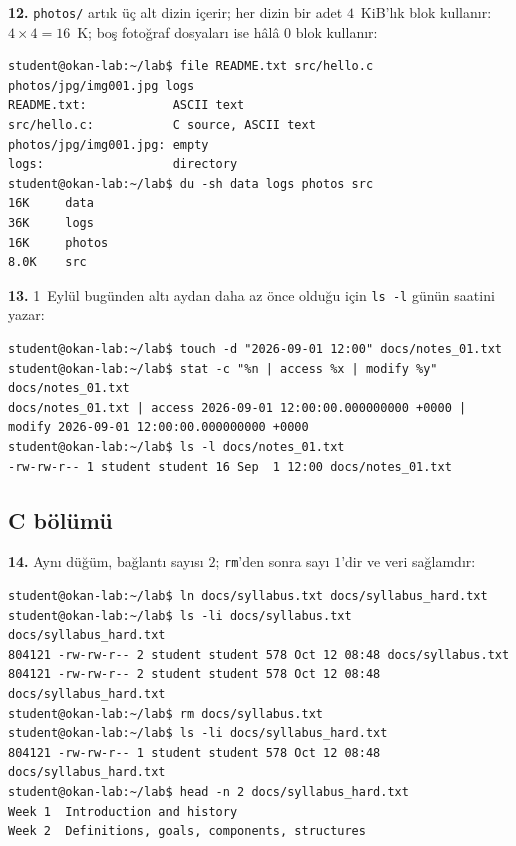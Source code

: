 \documentclass[11pt,a4paper]{article}
\newcommand{\cmd}[1]{\texttt{#1}}
\begin{document}
\textbf{12.} \texttt{photos/} artık üç alt dizin içerir; her dizin bir adet $4$~KiB'lık blok kullanır: $4 \times 4 = 16$~K; boş fotoğraf dosyaları ise hâlâ $0$ blok kullanır:
\begin{lstlisting}[style=term,basicstyle=\ttfamily\scriptsize\color{light}]
student@okan-lab:~/lab$ file README.txt src/hello.c photos/jpg/img001.jpg logs
README.txt:            ASCII text
src/hello.c:           C source, ASCII text
photos/jpg/img001.jpg: empty
logs:                  directory
student@okan-lab:~/lab$ du -sh data logs photos src
16K     data
36K     logs
16K     photos
8.0K    src
\end{lstlisting}

\textbf{13.} 1~Eylül bugünden altı aydan daha az önce olduğu için \cmd{ls -l} günün saatini yazar:
\begin{lstlisting}[style=term,basicstyle=\ttfamily\scriptsize\color{light}]
student@okan-lab:~/lab$ touch -d "2026-09-01 12:00" docs/notes_01.txt
student@okan-lab:~/lab$ stat -c "%n | access %x | modify %y" docs/notes_01.txt
docs/notes_01.txt | access 2026-09-01 12:00:00.000000000 +0000 | modify 2026-09-01 12:00:00.000000000 +0000
student@okan-lab:~/lab$ ls -l docs/notes_01.txt
-rw-rw-r-- 1 student student 16 Sep  1 12:00 docs/notes_01.txt
\end{lstlisting}

\subsection*{C bölümü}

\textbf{14.} Aynı düğüm, bağlantı sayısı $2$; \cmd{rm}'den sonra sayı $1$'dir ve veri sağlamdır:
\begin{lstlisting}[style=term,basicstyle=\ttfamily\scriptsize\color{light}]
student@okan-lab:~/lab$ ln docs/syllabus.txt docs/syllabus_hard.txt
student@okan-lab:~/lab$ ls -li docs/syllabus.txt docs/syllabus_hard.txt
804121 -rw-rw-r-- 2 student student 578 Oct 12 08:48 docs/syllabus.txt
804121 -rw-rw-r-- 2 student student 578 Oct 12 08:48 docs/syllabus_hard.txt
student@okan-lab:~/lab$ rm docs/syllabus.txt
student@okan-lab:~/lab$ ls -li docs/syllabus_hard.txt
804121 -rw-rw-r-- 1 student student 578 Oct 12 08:48 docs/syllabus_hard.txt
student@okan-lab:~/lab$ head -n 2 docs/syllabus_hard.txt
Week 1  Introduction and history
Week 2  Definitions, goals, components, structures
\end{lstlisting}
\end{document}
